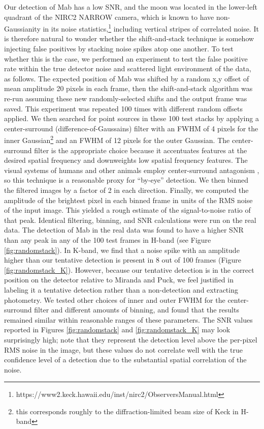 \documentclass[preprint]{aastex631}
\begin{document}
Our detection of Mab has a low SNR, and the moon was located in the lower-left quadrant of the NIRC2 NARROW camera, which is known to have non-Gaussianity in its noise statistics,\footnote{https://www2.keck.hawaii.edu/inst/nirc2/ObserversManual.html} including vertical stripes of correlated noise. It is therefore natural to wonder whether the shift-and-stack technique is somehow injecting false positives by stacking noise spikes atop one another. To test whether this is the case, we performed an experiment to test the false positive rate within the true detector noise and scattered light environment of the data, as follows. The expected position of Mab was shifted by a random x,y offset of mean amplitude 20 pixels in each frame, then the shift-and-stack algorithm was re-run assuming these new randomly-selected shifts and the output frame was saved. This experiment was repeated 100 times with different random offsets applied. We then searched for point sources in these 100 test stacks by applying a center-surround (difference-of-Gaussains) filter with an FWHM of 4 pixels for the inner Gaussian\footnote{this corresponds roughly to the diffraction-limited beam size of Keck in H-band} and an FWHM of 12 pixels for the outer Gaussian. The center-surround filter is the appropriate choice because it accentuates features at the desired spatial frequency and downweights low spatial frequency features. The visual systems of humans and other animals employ center-surround antagonism \citep{graham06}, so this technique is a reasonable proxy for ``by-eye'' detection. We then binned the filtered images by a factor of 2 in each direction. Finally, we computed the amplitude of the brightest pixel in each binned frame in units of the RMS noise of the input image. This yielded a rough estimate of the signal-to-noise ratio of that peak. Identical filtering, binning, and SNR calculations were run on the real data. The detection of Mab in the real data was found to have a higher SNR than any peak in any of the 100 test frames in H-band (see Figure \ref{fig:randomstack}). In K-band, we find that a noise spike with an amplitude higher than our tentative detection is present in 8 out of 100 frames (Figure \ref{fig:randomstack_K}). However, because our tentative detection is in the correct position on the detector relative to Miranda and Puck, we feel justified in labeling it a tentative detection rather than a non-detection and extracting photometry. We tested other choices of inner and outer FWHM for the center-surround filter and different amounts of binning, and found that the results remained similar within reasonable ranges of these parameters. The SNR values reported in Figures \ref{fig:randomstack} and \ref{fig:randomstack_K} may look surprisingly high; note that they represent the detection level above the per-pixel RMS noise in the image, but these values do not correlate well with the true confidence level of a detection due to the substantial spatial correlation of the noise.
\end{document}
